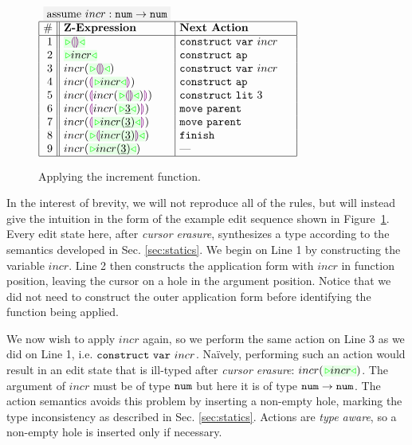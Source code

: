 \begin{figure}
  \label{ex2}
\begin{center}
$\arraycolsep=4px
\begin{array}{|r||l|l|}
\multicolumn{2}{c}{\colorbox{light-gray}{assume $incr : \tarr{\tnum}{\tnum}$}}
\\
\hline
\# & \textbf{Z-Expression} &
\textbf{Next Action} 
\\
\hline
1 &
\zwsel{\hhole{}} &
\aConstruct{\fvar{incr}} \hphantom{~\,\,~~}
\\ 2 &
\zwsel{incr} &
\aConstruct{\fap}
\\ 3 &
incr(\zwsel{\hhole{}}) &
\aConstruct{\fvar{incr}}
\\ 4 &
incr(\hhole{\zwsel{incr}}) &
\aConstruct{\fap}
\\ 5 &
incr(\hhole{incr(\zwsel{\hhole{}})}) \hphantom{~~~~} &
\aConstruct{\fnumlit{3}}
\\ 6 &
incr(\hhole{incr(\zwsel{\hnum{3}})}) &
\aMove{\dParent}
\\ 7 &
incr(\hhole{\zwsel{incr(\hnum{3})}}) &
\aMove{\dParent}
\\ 8 &
incr(\zwsel{\hhole{incr(\hnum{3})}})&
\aFinish
\\ 9 &
incr(\zwsel{incr(\hnum{3})}) &
\textrm{---}
\\ \hline
\end{array}
$\end{center}\vspace{-10px}
\caption{Applying the increment function.}
\label{fig:second-example}
\end{figure}
In the interest of brevity, we will not reproduce all of the rules, but will
instead give the intuition in the form of the example edit
sequence shown in Figure~\ref{fig:second-example}. Every edit state here, after \emph{cursor erasure}, synthesizes a type according
to the semantics developed in Sec. \ref{sec:statics}. 
We begin on Line 1 by constructing the variable $incr$. Line 2 then
constructs the application form with $incr$ in function position, leaving
the cursor on a hole in the argument position. Notice that we did not need
to construct the outer application form before identifying the function
being applied. 

%
We now wish to apply $incr$ again, so we perform the same action on Line 3
as we did on Line 1, i.e. $\mathtt{construct}~\mathtt{var}~incr$. Na\"ively, performing such an action would result in an 
edit state that is ill-typed after \emph{cursor erasure}:
$incr(\zwsel{incr})$. 
The argument of
$incr$ must be of type $\texttt{num}$ but here it is of type
$\texttt{num} \rightarrow \texttt{num}$. The action semantics avoids this problem by inserting a non-empty hole, marking the type inconsistency as described in Sec. \ref{sec:statics}. Actions are \emph{type aware}, so a non-empty hole is inserted only if necessary.

